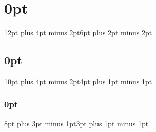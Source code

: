 \usepackage{microtype}
\usepackage{setspace}
\usepackage{titlesec}
\titlespacing\section{0pt}{12pt plus 4pt minus 2pt}{6pt plus 2pt minus 2pt}
\titlespacing\subsection{0pt}{10pt plus 4pt minus 2pt}{4pt plus 1pt minus 1pt}
\titlespacing\subsubsection{0pt}{8pt plus 3pt minus 1pt}{3pt plus 1pt minus 1pt}
\usepackage{newunicodechar}

